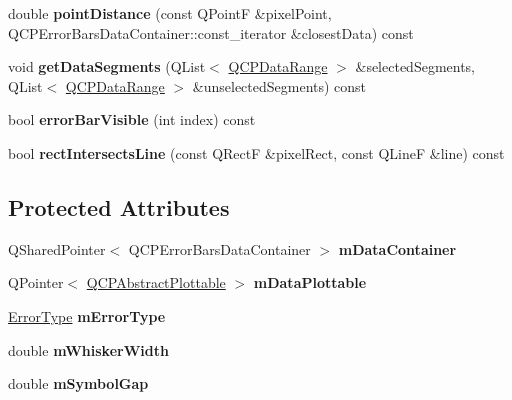 \begin{DoxyCompactItemize}
\item 
double {\bfseries point\+Distance} (const Q\+PointF \&pixel\+Point, Q\+C\+P\+Error\+Bars\+Data\+Container\+::const\+\_\+iterator \&closest\+Data) const \hypertarget{classQCPErrorBars_a6701c510c6a0ad95d3335c6f2470eca0}{}\label{classQCPErrorBars_a6701c510c6a0ad95d3335c6f2470eca0}

\item 
void {\bfseries get\+Data\+Segments} (Q\+List$<$ \hyperlink{classQCPDataRange}{Q\+C\+P\+Data\+Range} $>$ \&selected\+Segments, Q\+List$<$ \hyperlink{classQCPDataRange}{Q\+C\+P\+Data\+Range} $>$ \&unselected\+Segments) const \hypertarget{classQCPErrorBars_a1e9fef8dd1853558c05d1235c1a1b033}{}\label{classQCPErrorBars_a1e9fef8dd1853558c05d1235c1a1b033}

\item 
bool {\bfseries error\+Bar\+Visible} (int index) const \hypertarget{classQCPErrorBars_ae654c5016cebd994b104684578358afe}{}\label{classQCPErrorBars_ae654c5016cebd994b104684578358afe}

\item 
bool {\bfseries rect\+Intersects\+Line} (const Q\+RectF \&pixel\+Rect, const Q\+LineF \&line) const \hypertarget{classQCPErrorBars_a4c2f5cf2afe52b702c07c977758b29dd}{}\label{classQCPErrorBars_a4c2f5cf2afe52b702c07c977758b29dd}

\end{DoxyCompactItemize}
\subsection*{Protected Attributes}
\begin{DoxyCompactItemize}
\item 
Q\+Shared\+Pointer$<$ Q\+C\+P\+Error\+Bars\+Data\+Container $>$ {\bfseries m\+Data\+Container}\hypertarget{classQCPErrorBars_a83c7f452d0eebd302a7e4fb3a1957634}{}\label{classQCPErrorBars_a83c7f452d0eebd302a7e4fb3a1957634}

\item 
Q\+Pointer$<$ \hyperlink{classQCPAbstractPlottable}{Q\+C\+P\+Abstract\+Plottable} $>$ {\bfseries m\+Data\+Plottable}\hypertarget{classQCPErrorBars_a14b6a5b49295990da84a05a3a89026bb}{}\label{classQCPErrorBars_a14b6a5b49295990da84a05a3a89026bb}

\item 
\hyperlink{classQCPErrorBars_a95f0220f11a72648b96480a85ce26474}{Error\+Type} {\bfseries m\+Error\+Type}\hypertarget{classQCPErrorBars_af9fd3117b86aac728c9e8e87c406ed9a}{}\label{classQCPErrorBars_af9fd3117b86aac728c9e8e87c406ed9a}

\item 
double {\bfseries m\+Whisker\+Width}\hypertarget{classQCPErrorBars_a3873724f7ac3392bdf9d46a47076a1d2}{}\label{classQCPErrorBars_a3873724f7ac3392bdf9d46a47076a1d2}

\item 
double {\bfseries m\+Symbol\+Gap}\hypertarget{classQCPErrorBars_a5cb5628b75e5aff0875710705666ec57}{}\label{classQCPErrorBars_a5cb5628b75e5aff0875710705666ec57}

\end{DoxyCompactItemize}
